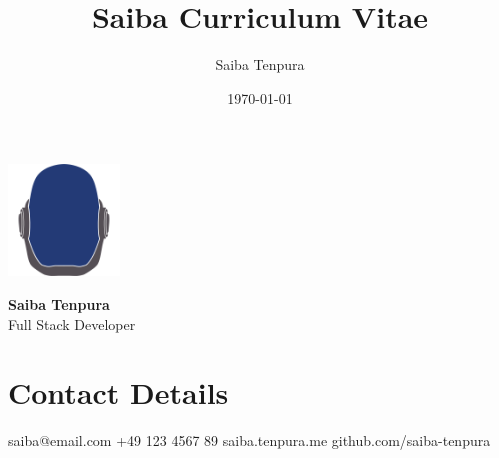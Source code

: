 \documentclass[9pt]{saiba-cv}
\title{Saiba Curriculum Vitae}
\author{Saiba Tenpura}
\date{\today}
\begin{document}

\colorbox{zinc-900}{%
  \begin{minipage}[c][\textheight][t]{0.225\textwidth}
    \color{white}
    \vspace{0.5cm}
    \centering\includegraphics[height=8em]{logo.png}
    \vspace{0.5cm}

    {\Large \textbf{Saiba Tenpura}} \\
    {\large Full Stack Developer}

    \section*{Contact Details}
    \contact
      {saiba@email.com}
      {+49 123 4567 89}
      {saiba.tenpura.me}
      {github.com/saiba-tenpura}

  \end{minipage}
}%
\hspace{0.25cm}
\end{document}
